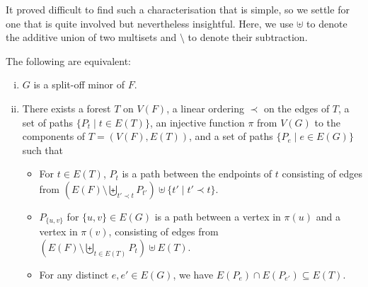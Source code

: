 \documentclass[11pt]{article}
\begin{document}
It proved difficult to find such a characterisation that is simple, so we settle for one that is quite involved but nevertheless insightful.
Here, we use $\uplus$ to denote the additive union of two multisets and $\setminus$ to denote their subtraction.
\begin{theorem}
    The following are equivalent:
    \begin{enumerate}[(i)]
        \item $G$ is a split-off minor of $F$.
        \item There exists a forest $T$ on $V(F)$, a linear ordering $\prec$ on the edges of $T$, a set of paths $\{P_t \mid t \in E(T)\}$, an injective function $\pi$ from $V(G)$ to the components of $T = (V(F), E(T))$, and a set of paths $\{P_e \mid e \in E(G)\}$ such that \begin{itemize}
            \item For $t \in E(T)$, $P_t$ is a path between the endpoints of $t$ consisting of edges from $(E(F) \setminus \biguplus_{t'\prec t} P_{t'}) \uplus \{t' \mid t'\prec t\}$.
            
            \item $P_{\{u,v\}}$ for $\{u,v\} \in E(G)$ is a path between a vertex in $\pi(u)$ and a vertex in $\pi(v)$, consisting of edges from $(E(F) \setminus \biguplus_{t\in E(T)} P_{t}) \uplus E(T)$.
            \item For any distinct $e,e' \in E(G)$, we have $E(P_e) \cap E(P_{e'}) \subseteq E(T)$.
        \end{itemize}
    \end{enumerate}
\end{theorem}
\end{document}
